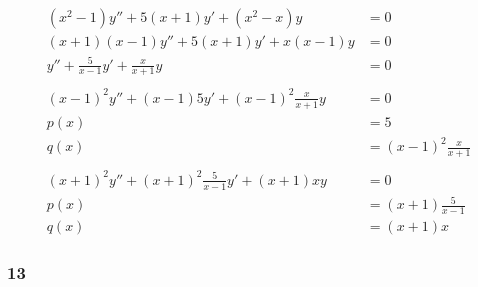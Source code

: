 \documentclass{article}
\begin{document}
\begin{align*}
  (x^2 - 1) y'' + 5 (x + 1) y' + (x^2 - x) y                 & = 0                         \\
  (x + 1) (x - 1) y'' + 5 (x + 1) y' + x (x - 1) y           & = 0                         \\
  y'' + \frac{5}{x - 1} y' + \frac{x}{x + 1} y               & = 0                         \\ \\
  (x - 1)^2 y'' + (x - 1) 5 y' + (x - 1)^2 \frac{x}{x + 1} y & = 0                         \\
  p(x)                                                       & = 5                         \\
  q(x)                                                       & = (x - 1)^2 \frac{x}{x + 1} \\ \\
  (x + 1)^2 y'' + (x + 1)^2 \frac{5}{x - 1} y' + (x + 1) x y & = 0                         \\
  p(x)                                                       & = (x + 1) \frac{5}{x - 1}   \\
  q(x)                                                       & = (x + 1) x
\end{align*}

\subsubsection{13}
\end{document}
